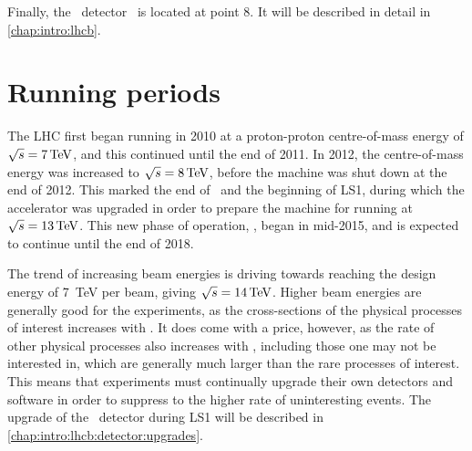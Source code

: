 Finally, the \lhcb\ detector~\cite{Alves:2008zz} is located at point 8.
It will be described in detail in \cref{chap:intro:lhcb}.

\section{Running periods}

The \ac{LHC} first began running in 2010 at a proton-proton centre-of-mass 
energy of $\sqrts = \SI{7}{\TeV}$, and this continued until the end of 2011.
In 2012, the centre-of-mass energy was increased to $\sqrts = \SI{8}{\TeV}$, 
before the machine was shut down at the end of 2012.
This marked the end of \runone\ and the beginning of \ac{LS1}, during which the 
accelerator was upgraded in order to prepare the machine for running at $\sqrts 
= \SI{13}{\TeV}$.
This new phase of operation, \runtwo, began in mid-2015, and is expected to 
continue until the end of 2018.

The trend of increasing beam energies is driving towards reaching the design 
energy of \SI{7}{\TeV} per beam, giving $\sqrts = \SI{14}{\TeV}$.
Higher beam energies are generally good for the experiments, as the 
cross-sections of the physical processes of interest increases with \sqrts.
It does come with a price, however, as the rate of other physical processes 
also increases with \sqrts, including those one may not be interested in, which 
are generally much larger than the rare processes of interest.
This means that experiments must continually upgrade their own detectors and 
software in order to suppress to the higher rate of uninteresting events.
The upgrade of the \lhcb\ detector during \ac{LS1} will be described in 
\cref{chap:intro:lhcb:detector:upgrades}.
